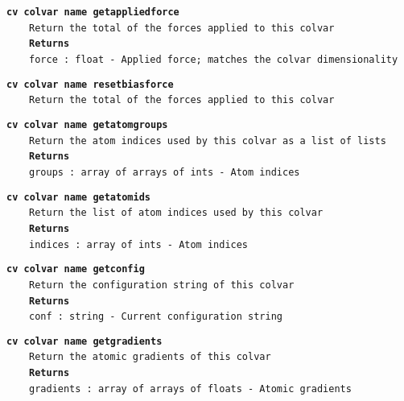 \begin{mdexampleinput}{}
\texttt{\textbf{cv colvar name getappliedforce}}
\\
\-~~~~\texttt{Return the total of the forces applied to this colvar}
\\
\-~~~~\texttt{\textbf{Returns}}
\\
\-~~~~\texttt{force : float - Applied force; matches the colvar dimensionality}
\end{mdexampleinput}
\begin{mdexampleinput}{}
\texttt{\textbf{cv colvar name resetbiasforce}}
\\
\-~~~~\texttt{Return the total of the forces applied to this colvar}
\end{mdexampleinput}
\begin{mdexampleinput}{}
\texttt{\textbf{cv colvar name getatomgroups}}
\\
\-~~~~\texttt{Return the atom indices used by this colvar as a list of lists}
\\
\-~~~~\texttt{\textbf{Returns}}
\\
\-~~~~\texttt{groups : array of arrays of ints - Atom indices}
\end{mdexampleinput}
\begin{mdexampleinput}{}
\texttt{\textbf{cv colvar name getatomids}}
\\
\-~~~~\texttt{Return the list of atom indices used by this colvar}
\\
\-~~~~\texttt{\textbf{Returns}}
\\
\-~~~~\texttt{indices : array of ints - Atom indices}
\end{mdexampleinput}
\begin{mdexampleinput}{}
\texttt{\textbf{cv colvar name getconfig}}
\\
\-~~~~\texttt{Return the configuration string of this colvar}
\\
\-~~~~\texttt{\textbf{Returns}}
\\
\-~~~~\texttt{conf : string - Current configuration string}
\end{mdexampleinput}
\begin{mdexampleinput}{}
\texttt{\textbf{cv colvar name getgradients}}
\\
\-~~~~\texttt{Return the atomic gradients of this colvar}
\\
\-~~~~\texttt{\textbf{Returns}}
\\
\-~~~~\texttt{gradients : array of arrays of floats - Atomic gradients}
\end{mdexampleinput}
